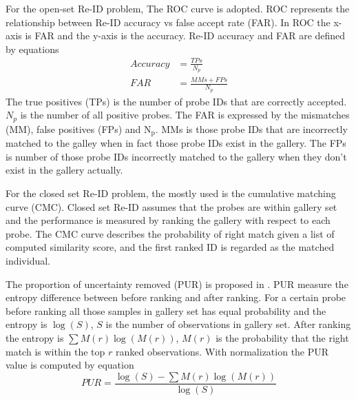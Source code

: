 For the open-set Re-ID problem, The ROC \cite{PartbasedSTReid, MultiPersonREID} curve is adopted. ROC represents the relationship between Re-ID accuracy vs false accept rate (FAR). In ROC the x-axis is FAR and the y-axis is the accuracy. Re-ID accuracy and FAR are defined by equations
\begin{equation}
\begin{aligned}
Accuracy &= \frac{TPs}{N_p}\\
FAR &= \frac{MMs + FPs}{N_p}
\end{aligned}
\end{equation}
The true positives (TPs) is the number of probe IDs that are correctly accepted. $N_p$ is the number of all positive probes. The FAR is expressed by the mismatches (MM), false positives (FPs) and N$_\text{p}$. MMs is those probe IDs that are incorrectly matched to the galley when in fact those probe IDs exist in the gallery. The FPs is number of those probe IDs incorrectly matched to the gallery when they don't exist in the gallery actually. 

For the closed set Re-ID problem, the mostly used is the cumulative matching curve (CMC). Closed set Re-ID assumes that the probes are within gallery set and the performance is measured by ranking the gallery with respect to each probe. The CMC curve describes the probability of right match given a list of computed similarity score, and the first ranked ID is regarded as the matched individual.

The proportion of uncertainty removed (PUR) is proposed in \cite{LFDA}. PUR measure the entropy difference between before ranking and after ranking. For a certain probe before ranking all those samples in gallery set has equal probability and the entropy is $\log(S)$, $S$ is the number of observations in gallery set. After ranking the entropy is $\sum M(r)\log(M(r))$, $M(r)$ is the probability that the right match is within the top $r$ ranked observations. With normalization the PUR value is computed by equation
\begin{equation}
PUR = \frac{\log(S)-\sum M(r)\log(M(r))}{\log(S)}
\end{equation}

